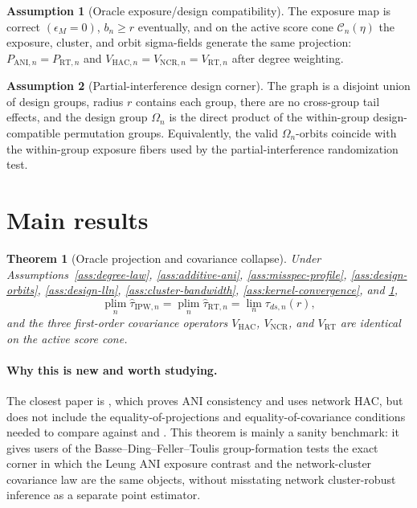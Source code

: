 \documentclass[11pt]{article}
\newcommand{\plim}{\operatorname*{plim}}
\theoremstyle{definition}
\newtheorem{assumption}{Assumption}
\theoremstyle{plain}
\newtheorem{theorem}{Theorem}
\theoremstyle{remark}
\begin{document}
\begin{assumption}[Oracle exposure/design compatibility]\label{ass:oracle-compatibility}
The exposure map is correct \((\epsilon_M=0)\), \(b_n\ge r\) eventually, and on
the active score cone \(\mathcal C_n(\eta)\) the exposure, cluster, and orbit sigma-fields generate
the same projection: \(P_{\mathrm{ANI},n}=P_{\mathrm{RT},n}\) and
\(V_{\mathrm{HAC},n}=V_{\mathrm{NCR},n}=V_{\mathrm{RT},n}\) after degree
weighting.
\end{assumption}

\begin{assumption}[Partial-interference design corner]\label{ass:partial-interference-corner}
The graph is a disjoint union of design groups, radius \(r\) contains each
group, there are no cross-group tail effects, and the design group
\(\Omega_n\) is the direct product of the within-group design-compatible
permutation groups.  Equivalently, the valid \(\Omega_n\)-orbits coincide with
the within-group exposure fibers used by the partial-interference
randomization test.
\end{assumption}

\section{Main results}
\begin{theorem}[Oracle projection and covariance collapse]\label{thm:oracle-collapse}
Under Assumptions~\ref{ass:degree-law}, \ref{ass:additive-ani},
\ref{ass:misspec-profile}, \ref{ass:design-orbits}, \ref{ass:design-lln},
\ref{ass:cluster-bandwidth}, \ref{ass:kernel-convergence}, and
\ref{ass:oracle-compatibility},
\[
  \plim_n \hat\tau_{\mathrm{IPW},n}
  =
  \plim_n \hat\tau_{\mathrm{RT},n}
  =
  \lim_n \tau_{ds,n}(r),
\]
and the three first-order covariance operators
\(V_{\mathrm{HAC}}\), \(V_{\mathrm{NCR}}\), and \(V_{\mathrm{RT}}\) are
identical on the active score cone.
\end{theorem}

\paragraph{Why this is new and worth studying.}
The closest paper is \citet{Leung2022ANI}, which proves ANI consistency and
uses network HAC, but does not include the equality-of-projections and
equality-of-covariance conditions needed to compare against
\citet{Leung2023NCRI} and \citet{BasseDingFellerToulis2024}.  This theorem is
mainly a sanity benchmark: it gives users of the Basse--Ding--Feller--Toulis
group-formation tests the exact corner in which the Leung ANI exposure
contrast and the network-cluster covariance law are the same objects, without
misstating network cluster-robust inference as a separate point estimator.
\end{document}
